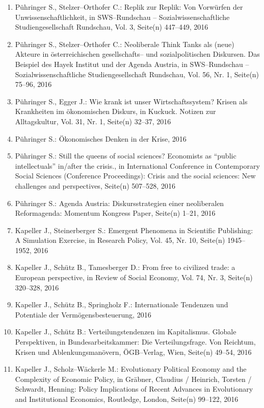 \begin{enumerate}
	 \item Pühringer S., Stelzer--Orthofer C.: Replik zur Replik: Von Vorwürfen der Unwissenschaftlichkeit, in SWS--Rundschau -- Sozialwissenschaftliche Studiengesellschaft Rundschau, Vol. 3, Seite(n) 447--449, 2016
	 \item Pühringer S., Stelzer--Orthofer C.: Neoliberale Think Tanks als (neue) Akteure in österreichischen gesellschafts-- und sozialpolitischen Diskursen. Das Beispiel des Hayek Institut und der Agenda Austria, in SWS--Rundschau -- Sozialwissenschaftliche Studiengesellschaft Rundschau, Vol. 56, Nr. 1, Seite(n) 75--96, 2016
	 \item Pühringer S., Egger J.: Wie krank ist unser Wirtschaftssystem? Krisen als Krankheiten im ökonomischen Diskurs, in Kuckuck. Notizen zur Alltagskultur, Vol. 31, Nr. 1, Seite(n) 32--37, 2016
	 \item Pühringer S.: Ökonomisches Denken in der Krise, 2016
	 \item Pühringer S.: Still the queens of social sciences? Economists as “public intellectuals” in/after the crisis., in International Conference in Contemporary Social Sciences (Conference Proceedings): Crisis and the social sciences: New challenges and perspectives, Seite(n) 507--528, 2016
	 \item Pühringer S.: Agenda Austria: Diskursstrategien einer neoliberalen Reformagenda: Momentum Kongress Paper, Seite(n) 1--21, 2016
	 \item Kapeller J., Steinerberger S.: Emergent Phenomena in Scientific Publishing: A Simulation Exercise, in Research Policy, Vol. 45, Nr. 10, Seite(n) 1945–1952, 2016
	 \item Kapeller J., Schütz B., Tamesberger D.: From free to civilized trade: a European perspective, in Review of Social Economy, Vol. 74, Nr. 3, Seite(n) 320--328, 2016
	 \item Kapeller J., Schütz B., Springholz F.: Internationale Tendenzen und Potentiale der Vermögensbesteuerung, 2016
	 \item Kapeller J., Schütz B.: Verteilungstendenzen im Kapitalismus. Globale Perspektiven, in Bundesarbeitskammer: Die Verteilungsfrage. Von Reichtum, Krisen und Ablenkungsmanövern, ÖGB--Verlag, Wien, Seite(n) 49--54, 2016
	 \item Kapeller J., Scholz--Wäckerle M.: Evolutionary Political Economy and the Complexity of Economic Policy, in Gräbner,  Claudius / Heinrich, Torsten / Schwardt, Henning: Policy  Implications of Recent Advances in Evolutionary and Institutional  Economics, Routledge, London, Seite(n) 99--122, 2016

\end{enumerate}
